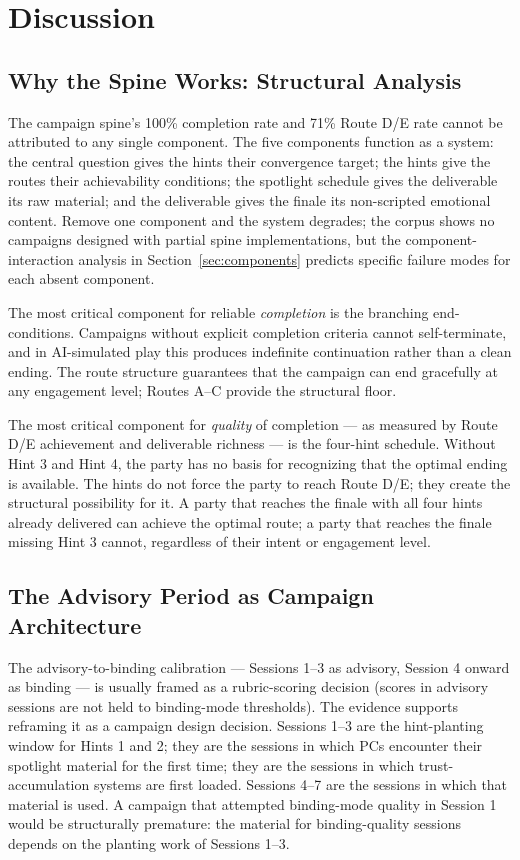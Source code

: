 
\section{Discussion}
\label{sec:discussion}

\subsection{Why the Spine Works: Structural Analysis}

The campaign spine's 100\% completion rate and 71\% Route D/E rate cannot be
attributed to any single component. The five components function as a system:
the central question gives the hints their convergence target; the hints give
the routes their achievability conditions; the spotlight schedule gives the
deliverable its raw material; and the deliverable gives the finale its
non-scripted emotional content. Remove one component and the system degrades;
the corpus shows no campaigns designed with partial spine implementations,
but the component-interaction analysis in Section~\ref{sec:components}
predicts specific failure modes for each absent component.

The most critical component for reliable \textit{completion} is the branching
end-conditions. Campaigns without explicit completion criteria cannot
self-terminate, and in AI-simulated play this produces indefinite continuation
rather than a clean ending. The route structure guarantees that the campaign
can end gracefully at any engagement level; Routes A--C provide the structural
floor.

The most critical component for \textit{quality} of completion --- as measured
by Route D/E achievement and deliverable richness --- is the four-hint schedule.
Without Hint 3 and Hint 4, the party has no basis for recognizing that the
optimal ending is available. The hints do not force the party to reach Route D/E;
they create the structural possibility for it. A party that reaches the finale
with all four hints already delivered can achieve the optimal route; a party
that reaches the finale missing Hint 3 cannot, regardless of their intent
or engagement level.

\subsection{The Advisory Period as Campaign Architecture}

The advisory-to-binding calibration --- Sessions 1--3 as advisory, Session 4
onward as binding --- is usually framed as a rubric-scoring decision (scores
in advisory sessions are not held to binding-mode thresholds). The evidence
supports reframing it as a campaign design decision. Sessions 1--3 are the
hint-planting window for Hints 1 and 2; they are the sessions in which PCs
encounter their spotlight material for the first time; they are the sessions
in which trust-accumulation systems are first loaded. Sessions 4--7 are the
sessions in which that material is used. A campaign that attempted binding-mode
quality in Session 1 would be structurally premature: the material for
binding-quality sessions depends on the planting work of Sessions 1--3.

